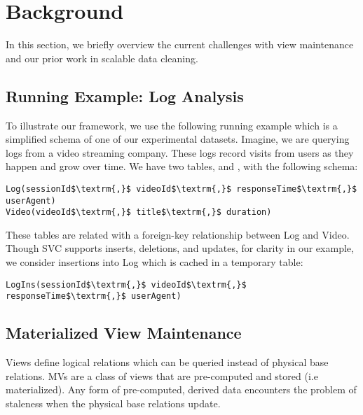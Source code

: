 \section{Background}\label{sec-background}
In this section, we briefly overview the current challenges with view maintenance and
our prior work in scalable data cleaning.


\subsection{Running Example: Log Analysis}
To illustrate our framework, we use the following running example which is a 
simplified schema of one of our experimental datasets.%
Imagine, we are querying logs from a video streaming company. 
These logs record visits from users as they happen and grow over time.
We have two tables,  and , with the following schema:

\begin{lstlisting}[mathescape]
Log(sessionId$\textrm{,}$ videoId$\textrm{,}$ responseTime$\textrm{,}$ userAgent)
Video(videoId$\textrm{,}$ title$\textrm{,}$ duration)
\end{lstlisting}
These tables are related with a foreign-key relationship between
Log and Video.
Though SVC supports inserts, deletions, and updates, for clarity in our example, we consider insertions
into Log which is cached in a temporary table:

\begin{lstlisting}[mathescape]
LogIns(sessionId$\textrm{,}$ videoId$\textrm{,}$ responseTime$\textrm{,}$ userAgent)
\end{lstlisting}


\iffalse
\subsection{Materialized View Maintenance}\label{subsec-inc}
Views define logical relations which can be queried instead of physical base relations.
MVs are a class of views that are pre-computed and stored (i.e materialized).
Any form of pre-computed, derived data encounters the problem of staleness when the physical base relations update.

